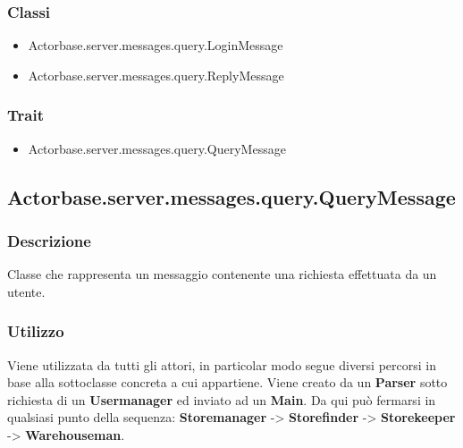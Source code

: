 \documentclass[a4paper]{article}
\begin{document}
			\subsubsection{Classi}
				\begin{itemize}
					\item Actorbase.server.messages.query.LoginMessage
					\item Actorbase.server.messages.query.ReplyMessage
				\end{itemize}
				
			\subsubsection{Trait}
				\begin{itemize}
					\item Actorbase.server.messages.query.QueryMessage
				\end{itemize}

		\subsection{Actorbase.server.messages.query.QueryMessage}
		\label{QueryMessage}
			\subsubsection{Descrizione}
				Classe che rappresenta un messaggio contenente una richiesta effettuata da un utente.
				
			\subsubsection{Utilizzo}
				Viene utilizzata da tutti gli attori, in particolar modo segue diversi percorsi in base alla sottoclasse concreta a cui appartiene.
				Viene creato da un \textbf{Parser} sotto richiesta di un \textbf{Usermanager} ed inviato ad un \textbf{Main}. Da qui può fermarsi in 
				qualsiasi punto della sequenza: \textbf{Storemanager} \space -> \space \textbf{Storefinder} 
				\space -> \space \textbf{Storekeeper} \space -> \space \textbf{Warehouseman}.
\end{document}
